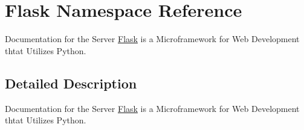 \hypertarget{namespace_flask}{}\section{Flask Namespace Reference}
\label{namespace_flask}


Documentation for the Server \mbox{\hyperlink{namespace_flask}{Flask}} is a Microframework for Web Development thtat Utilizes Python.  




\subsection{Detailed Description}
Documentation for the Server \mbox{\hyperlink{namespace_flask}{Flask}} is a Microframework for Web Development thtat Utilizes Python. 